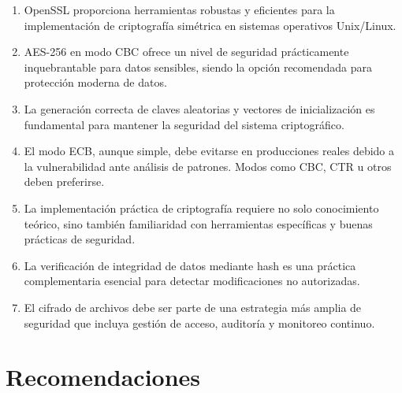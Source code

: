 \documentclass[11pt,a4paper]{article}
\begin{document}
\begin{enumerate}
    \item OpenSSL proporciona herramientas robustas y eficientes para la implementación de criptografía simétrica en sistemas operativos Unix/Linux.

    \item AES-256 en modo CBC ofrece un nivel de seguridad prácticamente inquebrantable para datos sensibles, siendo la opción recomendada para protección moderna de datos.

    \item La generación correcta de claves aleatorias y vectores de inicialización es fundamental para mantener la seguridad del sistema criptográfico.

    \item El modo ECB, aunque simple, debe evitarse en producciones reales debido a la vulnerabilidad ante análisis de patrones. Modos como CBC, CTR u otros deben preferirse.

    \item La implementación práctica de criptografía requiere no solo conocimiento teórico, sino también familiaridad con herramientas específicas y buenas prácticas de seguridad.

    \item La verificación de integridad de datos mediante hash es una práctica complementaria esencial para detectar modificaciones no autorizadas.

    \item El cifrado de archivos debe ser parte de una estrategia más amplia de seguridad que incluya gestión de acceso, auditoría y monitoreo continuo.
\end{enumerate}

\section{Recomendaciones}
\end{document}

